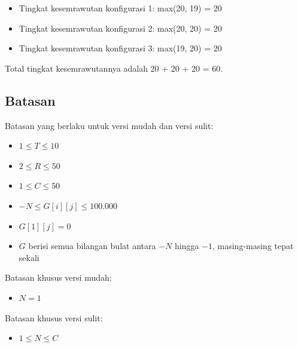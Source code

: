 \documentclass[../main_problemset.tex]{subfiles} %
\begin{document}
\begin{itemize}
	\item Tingkat kesemrawutan konfigurasi 1: max(20, 19) = 20
	\item Tingkat kesemrawutan konfigurasi 2: max(20, 20) = 20
	\item Tingkat kesemrawutan konfigurasi 3: max(19, 20) = 20
\end{itemize}

Total tingkat kesemrawutannya adalah 20 + 20 + 20 = 60.

\subsection*{Batasan}

\begin{minipage}[t]{0.47\textwidth}
    
Batasan yang berlaku untuk versi mudah dan versi sulit:

\begin{itemize}
	\item $ 1 \le T \le 10 $
	\item $ 2 \le R \le 50 $
	\item $ 1 \le C \le 50 $
	\item $ -N \le G[i][j] \le 100.000 $
	\item $ G[1][j] = 0 $
	\item $ G $ berisi semua bilangan bulat antara $ -N $ hingga $ -1 $, masing-masing tepat sekali
\end{itemize}
\end{minipage}
\begin{minipage}[t]{0.06\textwidth}
    \hfill
\end{minipage}
\begin{minipage}[t]{0.47\textwidth}
Batasan khusus versi mudah:

\begin{itemize}
	\item $ N = 1 $
\end{itemize}

\vspace{.2cm}

Batasan khusus versi sulit:

\begin{itemize}
	\item $1 \le N \le C$
\end{itemize}
\end{minipage}
\end{document}
